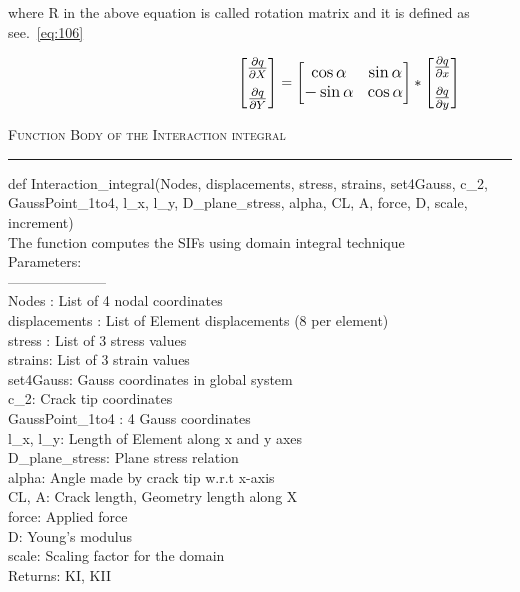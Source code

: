 \documentclass[fleqn, 12.5pt,a4paper]{report}
\begin{document}
where R in the above equation is called rotation matrix and it is defined as see.~\autoref{eq:106}

\begin{align}\label{eq:106}\hspace{4.5cm}
\large \begin{bmatrix} 
\pdv{q} {X} \\[7pt]
\pdv{q} {Y} \\
\end{bmatrix} \large
=
\begin{bmatrix}
\cos\alpha & \sin\alpha\\
-\sin\alpha & \cos\alpha\\
\end{bmatrix}
*
\large \begin{bmatrix} 
\pdv{q} {x} \\[7pt]
\pdv{q} {y} \\
\end{bmatrix} \large
\end{align}

\hspace{-0.5cm}{\color{black} \rule{\linewidth}{0.05cm}}
	{\scshape Function Body of the Interaction integral}\\
{\color{black} \rule{\linewidth}{0.05cm}}
{\selectfont
def Interaction{\_}integral(Nodes, displacements, stress, strains, set4Gauss, c{\_}2, GaussPoint{\_}1to4, l{\_}x, l{\_}y, D{\_}plane{\_}stress, alpha, CL, A, force, D, scale, \\
increment)\\
    The function computes the SIFs using domain integral technique\\
    Parameters:\\
    ---------------------\\
    Nodes : List of 4 nodal coordinates\\
    displacements : List of Element displacements (8 per element)\\
    stress : List of 3 stress values\\
    strains: List of 3 strain values\\
    set4Gauss: Gauss coordinates in global system\\
    c{\_}2: Crack tip coordinates\\
    GaussPoint{\_}1to4 : 4 Gauss coordinates \\
    l{\_}x, l{\_}y: Length of Element along x and y axes\\
    D{\_}plane{\_}stress: Plane stress relation\\
    alpha: Angle made by crack tip w.r.t x-axis\\
    CL, A: Crack length, Geometry length along X\\
    force: Applied force\\
    D: Young's modulus\\
    scale: Scaling factor for the domain\\
    Returns: KI, KII}
    
\end{document}
